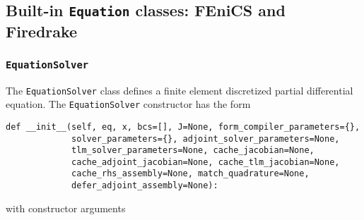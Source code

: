 \documentclass[11pt]{article}
\begin{document}
\subsection{Built-in \texttt{Equation} classes: FEniCS and Firedrake}

\subsubsection{\texttt{EquationSolver}}\label{sect:EquationSolver}

The \texttt{EquationSolver} class defines a finite element discretized partial
differential equation. The \texttt{EquationSolver} constructor has the form
\begin{lstlisting}
def __init__(self, eq, x, bcs=[], J=None, form_compiler_parameters={},
             solver_parameters={}, adjoint_solver_parameters=None,
             tlm_solver_parameters=None, cache_jacobian=None,
             cache_adjoint_jacobian=None, cache_tlm_jacobian=None,
             cache_rhs_assembly=None, match_quadrature=None,
             defer_adjoint_assembly=None):
\end{lstlisting}
with constructor arguments
\end{document}
